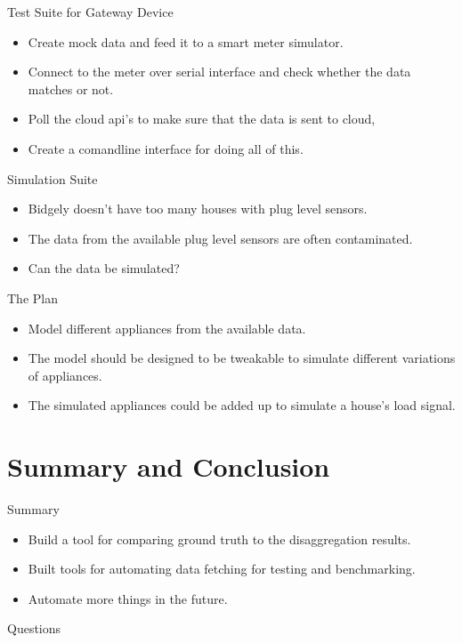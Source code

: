 \documentclass[xcolor=svgnames,handout]{beamer}
\begin{document}
    \begin{frame}
      {Test Suite for Gateway Device}
      \begin{itemize}
      \item Create mock data and feed it to a smart meter simulator.
      \item Connect to the meter over serial interface and check
        whether the data matches or not.
      \item Poll the cloud api's to make sure that the data is sent to
        cloud,
      \item Create a comandline interface for doing all of this.
      \end{itemize}
    \end{frame}

    \begin{frame}
      {Simulation Suite}
      \begin{itemize}
      \item Bidgely doesn't have too many houses with plug level
        sensors.
      \item The data from the available plug level sensors are often
        contaminated.
      \item Can the data be simulated?
      \end{itemize}
    \end{frame}

    \begin{frame}{The Plan}
      \begin{itemize}
      \item Model different appliances from the available data.
      \item The model should be designed to be tweakable to simulate
        different variations of appliances.
      \item The simulated appliances could be added up to simulate a
        house's load signal.
      \end{itemize}
    \end{frame}
    \section
        {Summary and Conclusion}

        \begin{frame}
          {Summary}

          \begin{itemize}
          \item Build a tool for comparing ground truth to the
            disaggregation results.
          \item Built tools for automating data fetching for testing
            and benchmarking.
          \item Automate more things in the future.
          \end{itemize}
        \end{frame}


        \begin{frame}
          {Questions}
        \end{frame}
\end{document}
